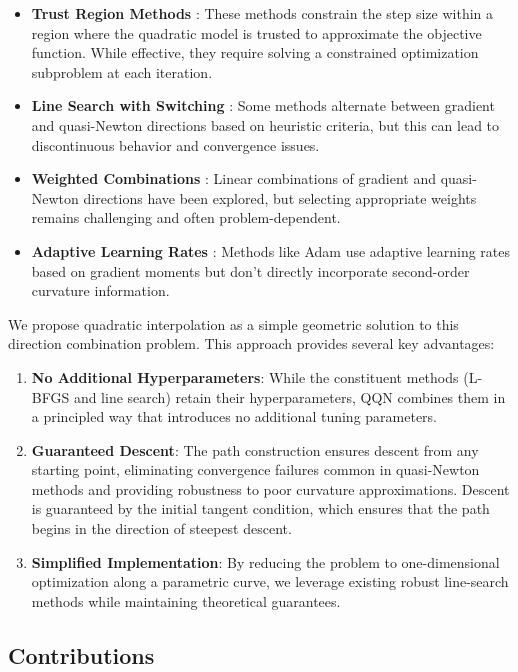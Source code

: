 \begin{itemize}
\item
  \textbf{Trust Region Methods} \citep{conn2000trust}: These methods constrain the step size within a region where the quadratic model is trusted to approximate the objective function. While effective, they require solving a constrained optimization subproblem at each iteration.
\item
  \textbf{Line Search with Switching} \citep{morales2000automatic}: Some methods alternate between gradient and quasi-Newton directions based on heuristic criteria, but this can lead to discontinuous behavior and convergence issues.
\item
  \textbf{Weighted Combinations} \citep{biggs1973minimization}: Linear combinations of gradient and quasi-Newton directions have been explored, but selecting appropriate weights remains challenging and often problem-dependent.
\item
  \textbf{Adaptive Learning Rates} \citep{kingma2015adam}: Methods like Adam use adaptive learning rates based on gradient moments but don't directly incorporate second-order curvature information.
\end{itemize}

We propose quadratic interpolation as a simple geometric solution to this direction combination problem.
This approach provides several key advantages:

\begin{enumerate}
\def\labelenumi{\arabic{enumi}.}
\item
  \textbf{No Additional Hyperparameters}: While the constituent methods (L-BFGS and line search) retain their hyperparameters, QQN combines them in a principled way that introduces no additional tuning parameters.
\item
  \textbf{Guaranteed Descent}: The path construction ensures descent from any starting point, eliminating convergence failures common in quasi-Newton methods and providing robustness to poor curvature approximations.
  Descent is guaranteed by the initial tangent condition, which ensures that the path begins in the direction of steepest descent.
\item
  \textbf{Simplified Implementation}: By reducing the problem to one-dimensional optimization along a parametric curve, we leverage existing robust line-search methods while maintaining theoretical guarantees.
\end{enumerate}

\hypertarget{contributions}{%
\subsection{Contributions}\label{contributions}}

